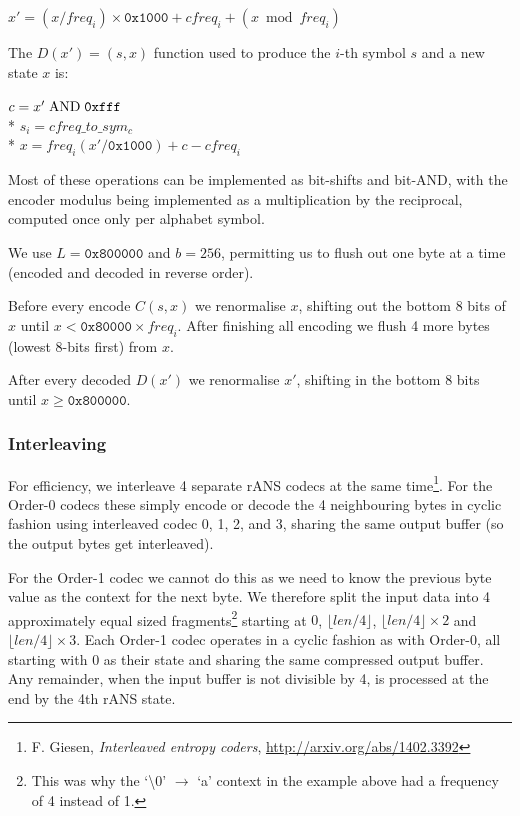 \documentclass[a4paper]{article}
\begin{document}
{
\setlength{\parindent}{1cm}
\indent    $x' = (x/freq_i) \times \mathtt{0x1000} + cfreq_i + (x \bmod freq_i)$
}

The $D(x') = (s,x)$ function used to produce the $i$-th symbol $s$ and
a new state $x$ is:

{
\setlength{\parindent}{1cm}
\indent    $c = x' \bitand \mathtt{0xfff}$\\*
\indent    $s_{i} = cfreq\_to\_sym_{c}$\\*
\indent    $x = freq_{i} (x' / \mathtt{0x1000}) + c - cfreq_{i}$
}

Most of these operations can be implemented as bit-shifts and bit-AND,
with the encoder modulus being implemented as a multiplication by the
reciprocal, computed once only per alphabet symbol.

We use $L = \mathtt{0x800000}$ and $b = 256$, permitting us to flush out one byte
at a time (encoded and decoded in reverse order).

Before every encode $C(s,x)$ we renormalise $x$, shifting out the bottom 8
bits of $x$ until $x < \mathtt{0x80000} \times freq_i$.  After
finishing all encoding we flush 4 more bytes (lowest 8-bits first) from $x$.

After every decoded $D(x')$ we renormalise $x'$, shifting in the bottom 8
bits until $x \geq \mathtt{0x800000}$.


\subsubsection*{Interleaving}

For efficiency, we interleave 4 separate rANS codecs at the same
time\footnote{F. Giesen, \textit{Interleaved entropy coders},
  \url{http://arxiv.org/abs/1402.3392}}.  For the Order-0 codecs these
simply encode or decode the 4 neighbouring bytes in cyclic fashion
using interleaved codec 0, 1, 2, and 3, sharing the same output buffer
(so the output bytes get interleaved).

For the Order-1 codec we cannot do this as we need to know the
previous byte value as the context for the next byte.  We therefore split
the input data into 4 approximately equal sized
fragments\footnote{This was why the `\textbackslash0' $\to$ `a'
  context in the example above had a frequency of 4 instead of 1.}
starting at $0$, $\lfloor{}len/4\rfloor{}$,
$\lfloor{}len/4\rfloor{}\times2$ and $\lfloor{}len/4\rfloor{}\times 3$.  Each
Order-1 codec operates in a cyclic fashion as with Order-0, all
starting with 0 as their state and sharing the same compressed output
buffer. Any remainder, when the input buffer is not divisible by 4, is
processed at the end by the 4th rANS state.
\end{document}

